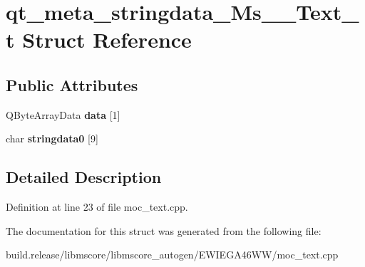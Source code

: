 \hypertarget{structqt__meta__stringdata___ms_____text__t}{}\section{qt\+\_\+meta\+\_\+stringdata\+\_\+\+Ms\+\_\+\+\_\+\+Text\+\_\+t Struct Reference}
\label{structqt__meta__stringdata___ms_____text__t}
\subsection*{Public Attributes}
\begin{DoxyCompactItemize}
\item 
\mbox{\label{structqt__meta__stringdata___ms_____text__t_aa2b867d2875c9f254c9dd92f8947b2f1}} 
Q\+Byte\+Array\+Data {\bfseries data} \mbox{[}1\mbox{]}
\item 
\mbox{\label{structqt__meta__stringdata___ms_____text__t_a4f55439a6e539c723c8e25111cf1434d}} 
char {\bfseries stringdata0} \mbox{[}9\mbox{]}
\end{DoxyCompactItemize}


\subsection{Detailed Description}


Definition at line 23 of file moc\+\_\+text.\+cpp.



The documentation for this struct was generated from the following file\+:\begin{DoxyCompactItemize}
\item 
build.\+release/libmscore/libmscore\+\_\+autogen/\+E\+W\+I\+E\+G\+A46\+W\+W/moc\+\_\+text.\+cpp\end{DoxyCompactItemize}
